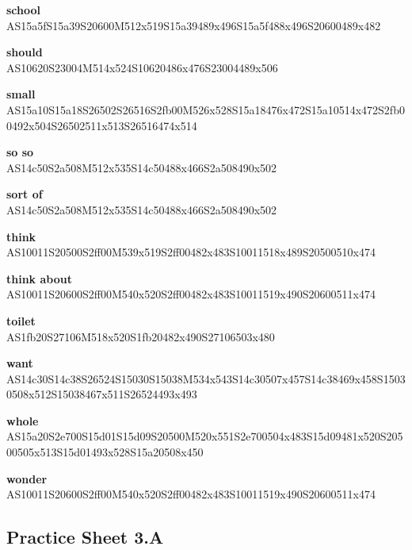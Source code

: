 \documentclass{article}
\begin{document}
\begin{glossary}
\textbf{school}\\
AS15a5fS15a39S20600M512x519S15a39489x496S15a5f488x496S20600489x482

\textbf{should}\\
AS10620S23004M514x524S10620486x476S23004489x506

\textbf{small}\\
AS15a10S15a18S26502S26516S2fb00M526x528S15a18476x472S15a10514x472S2fb00492x504S26502511x513S26516474x514

\textbf{so so}\\
AS14c50S2a508M512x535S14c50488x466S2a508490x502

\textbf{sort of}\\
AS14c50S2a508M512x535S14c50488x466S2a508490x502

\textbf{think}\\
AS10011S20500S2ff00M539x519S2ff00482x483S10011518x489S20500510x474

\textbf{think about}\\
AS10011S20600S2ff00M540x520S2ff00482x483S10011519x490S20600511x474

\textbf{toilet}\\
AS1fb20S27106M518x520S1fb20482x490S27106503x480

\textbf{want}\\
AS14c30S14c38S26524S15030S15038M534x543S14c30507x457S14c38469x458S15030508x512S15038467x511S26524493x493

\textbf{whole}\\
AS15a20S2e700S15d01S15d09S20500M520x551S2e700504x483S15d09481x520S20500505x513S15d01493x528S15a20508x450

\textbf{wonder}\\
AS10011S20600S2ff00M540x520S2ff00482x483S10011519x490S20600511x474

\end{glossary}

\subsection{Practice Sheet 3.A}
\end{document}
